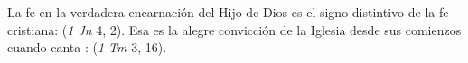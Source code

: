 	 La fe en la verdadera encarnación del Hijo de Dios es el signo distintivo de la fe cristiana:  (\emph{1 Jn} 4, 2). Esa es la alegre convicción de la Iglesia desde sus comienzos cuando canta :  (\emph{1 Tm} 3, 16).
